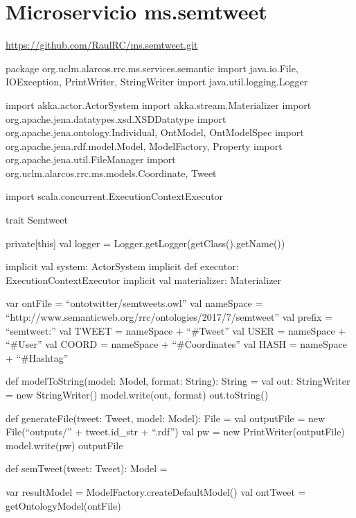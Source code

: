 \chapter{Microservicio ms.semtweet}
\label{chap:ms.semtweet}

\url{https://github.com/RaulRC/ms.semtweet.git}

\begin{listing}[
  language = scala,
  numbers=left,
  numberstyle=\tiny,
  stepnumber=5,
  numbersep=5pt,
  frame=single,
  caption  = {ms.semtweet: transformación a triplas},
  label    = code:ms.semtweet]


package org.uclm.alarcos.rrc.ms.services.semantic
import java.io.{File, IOException, PrintWriter, StringWriter}
import java.util.logging.Logger

import akka.actor.ActorSystem
import akka.stream.Materializer
import org.apache.jena.datatypes.xsd.XSDDatatype
import org.apache.jena.ontology.{Individual, OntModel, OntModelSpec}
import org.apache.jena.rdf.model.{Model, ModelFactory, Property}
import org.apache.jena.util.FileManager
import org.uclm.alarcos.rrc.ms.models.{Coordinate, Tweet}

import scala.concurrent.ExecutionContextExecutor

trait Semtweet {

  private[this] val logger = Logger.getLogger(getClass().getName())

  implicit val system: ActorSystem
  implicit def executor: ExecutionContextExecutor
  implicit val materializer: Materializer

  var ontFile = ``ontotwitter/semtweets.owl''
  val nameSpace = ``http://www.semanticweb.org/rrc/ontologies/2017/7/semtweet''
  val prefix = ``semtweet:''
  val TWEET = nameSpace + ``#Tweet''
  val USER = nameSpace + ``#User''
  val COORD = nameSpace + ``#Coordinates''
  val HASH = nameSpace + ``#Hashtag''

  def modelToString(model: Model, format: String): String = {
    val out: StringWriter = new StringWriter()
    model.write(out, format)
    out.toString()
  }

  def generateFile(tweet: Tweet, model: Model): File = {
    val outputFile = new File(``outputs/'' + tweet.id_str + ``.rdf'')
    val pw = new PrintWriter(outputFile)
    model.write(pw)
    outputFile
  }

  def semTweet(tweet: Tweet): Model = {
    var resultModel = ModelFactory.createDefaultModel()
    val ontTweet  = getOntologyModel(ontFile)

}}
\end{listing}
